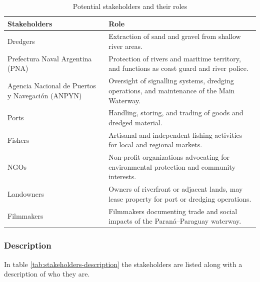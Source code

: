 \begin{table}[H]
\centering
\begin{tabularx}{\linewidth}{p{3.5cm}X} %
\toprule
Stakeholders & Role \\
\midrule
Dredgers & Extraction of sand and gravel from shallow river areas. \\
\midrule
Prefectura Naval Argentina (PNA) & Protection of rivers and maritime territory, and functions as coast guard and river police. \\
\midrule
Agencia Nacional de Puertos y Navegación (ANPYN) & Oversight of signalling systems, dredging operations, and maintenance of the Main Waterway. \\
\midrule
Ports & Handling, storing, and trading of goods and dredged material. \\
\midrule
Fishers & Artisanal and independent fishing activities for local and regional markets. \\
\midrule
NGOs & Non-profit organizations advocating for environmental protection and community interests. \\
\midrule
Landowners & Owners of riverfront or adjacent lands, may lease property for port or dredging operations. \\
\midrule
Filmmakers & Filmmakers documenting trade and social impacts of the Paraná–Paraguay waterway. \\
\bottomrule
\end{tabularx}
\caption{Potential stakeholders and their roles}
\label{tab:stakeholders}
\end{table}

\newpage

\subsubsection{Description}
In table \ref{tab:stakeholders-description} the stakeholders are listed along with a description of who they are.


